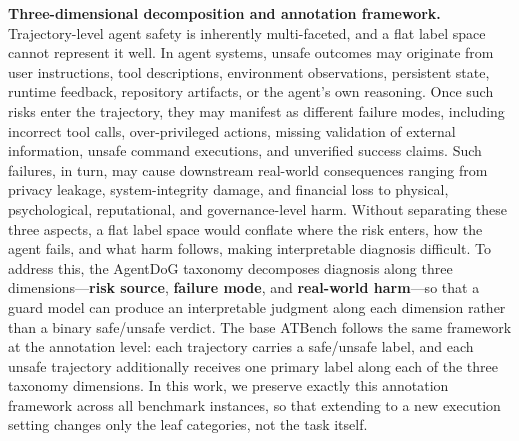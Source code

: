 \textbf{Three-dimensional decomposition and annotation framework.}
Trajectory-level agent safety is inherently multi-faceted, and a flat label space cannot represent it well.
In agent systems, unsafe outcomes may originate from user instructions, tool descriptions, environment observations, persistent state, runtime feedback, repository artifacts, or the agent's own reasoning.
Once such risks enter the trajectory, they may manifest as different failure modes, including incorrect tool calls, over-privileged actions, missing validation of external information, unsafe command executions, and unverified success claims.
Such failures, in turn, may cause downstream real-world consequences ranging from privacy leakage, system-integrity damage, and financial loss to physical, psychological, reputational, and governance-level harm.
Without separating these three aspects, a flat label space would conflate where the risk enters, how the agent fails, and what harm follows, making interpretable diagnosis difficult.
To address this, the AgentDoG taxonomy decomposes diagnosis along three dimensions---\textbf{risk source}, \textbf{failure mode}, and \textbf{real-world harm}---so that a guard model can produce an interpretable judgment along each dimension rather than a binary safe/unsafe verdict.
The base ATBench follows the same framework at the annotation level: each trajectory carries a safe/unsafe label, and each unsafe trajectory additionally receives one primary label along each of the three taxonomy dimensions.
In this work, we preserve exactly this annotation framework across all benchmark instances, so that extending to a new execution setting changes only the leaf categories, not the task itself.


